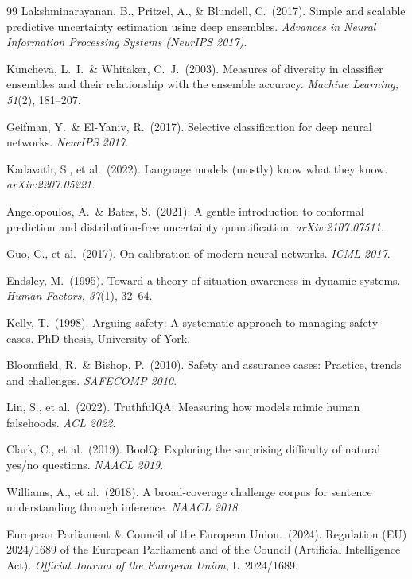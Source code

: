\documentclass[10pt,twocolumn]{article}
\begin{document}
\begin{thebibliography}{99}
Lakshminarayanan, B., Pritzel, A., \& Blundell, C.\ (2017).
Simple and scalable predictive uncertainty estimation using deep ensembles.
\emph{Advances in Neural Information Processing Systems (NeurIPS 2017)}.

Kuncheva, L.\ I.\ \& Whitaker, C.\ J.\ (2003).
Measures of diversity in classifier ensembles and their relationship with
the ensemble accuracy.
\emph{Machine Learning, 51}(2), 181--207.

Geifman, Y.\ \& El-Yaniv, R.\ (2017).
Selective classification for deep neural networks.
\emph{NeurIPS 2017}.

Kadavath, S., et al.\ (2022).
Language models (mostly) know what they know.
\emph{arXiv:2207.05221}.

Angelopoulos, A.\ \& Bates, S.\ (2021).
A gentle introduction to conformal prediction and distribution-free uncertainty quantification.
\emph{arXiv:2107.07511}.

Guo, C., et al.\ (2017).
On calibration of modern neural networks.
\emph{ICML 2017}.

Endsley, M.\ (1995).
Toward a theory of situation awareness in dynamic systems.
\emph{Human Factors, 37}(1), 32--64.

Kelly, T.\ (1998).
Arguing safety: A systematic approach to managing safety cases.
PhD thesis, University of York.

Bloomfield, R.\ \& Bishop, P.\ (2010).
Safety and assurance cases: Practice, trends and challenges.
\emph{SAFECOMP 2010}.

Lin, S., et al.\ (2022).
TruthfulQA: Measuring how models mimic human falsehoods.
\emph{ACL 2022}.

Clark, C., et al.\ (2019).
BoolQ: Exploring the surprising difficulty of natural yes/no questions.
\emph{NAACL 2019}.

Williams, A., et al.\ (2018).
A broad-coverage challenge corpus for sentence understanding through inference.
\emph{NAACL 2018}.

European Parliament \& Council of the European Union.\ (2024).
Regulation (EU) 2024/1689 of the European Parliament and of the Council
(Artificial Intelligence Act).
\emph{Official Journal of the European Union}, L~2024/1689.


\end{thebibliography}
\end{document}
